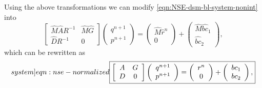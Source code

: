 \documentclass{article}
\numberwithin{equation}{section}
\begin{document}
Using the above transformations we can modify \cref{eqn:NSE-dsm-bl-system-nonint}
into 
\begin{equation*}
\left[\begin{array}{cc}
\hat{M}\hat{A}R^{-1} & \hat{M}\hat{G} \\
\hat{D}R^{-1} & 0
\end{array}\right]\left(\begin{array}{c}
q^{n+1} \\
p^{n+1}
\end{array}\right)=\left(\begin{array}{c}
\hat{M}\hat{r}^n \\
0
\end{array}\right)+\left(\begin{array}{c}
\hat{M}\widehat{b c}_1 \\
\widehat{b c}_2
\end{array}\right),
\end{equation*}
which can be rewritten as 
\begin{equation}\label[system]{eqn:nse-normalized}
\boxed{\left[\begin{array}{cc}
A & G \\
D & 0
\end{array}\right]\left(\begin{array}{c}
q^{n+1} \\
p^{n+1}
\end{array}\right)=\left(\begin{array}{c}
r^n \\
0
\end{array}\right)+\left(\begin{array}{c}
{b c}_1 \\
{b c}_2
\end{array}\right),}
\end{equation}
\end{document}
